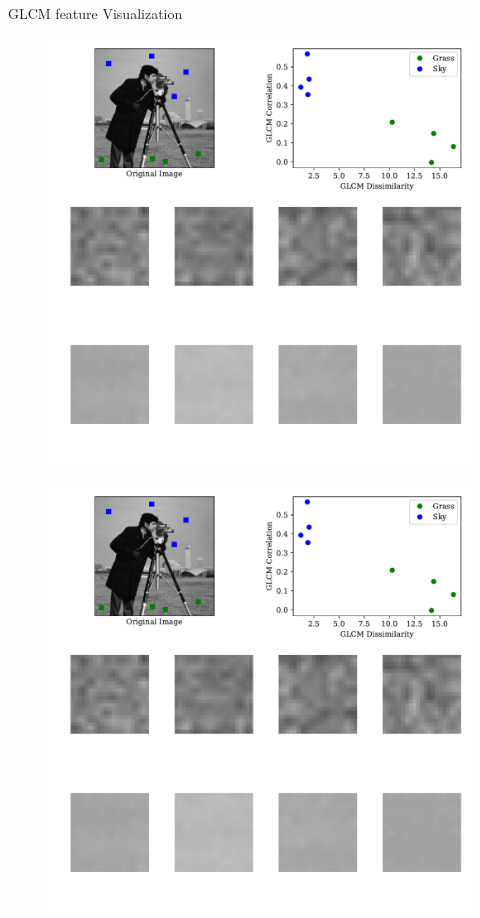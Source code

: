 \begin{frame}{GLCM feature Visualization}
\begin{figure}
\includegraphics[scale=0.45]{Figures/glcmImg01.pdf}\\
~~\includegraphics[scale=0.45]{Figures/glcmImg02.pdf}
\end{figure}
\end{frame}

